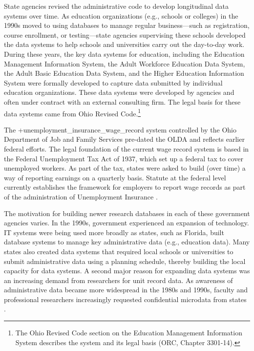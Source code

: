 \documentclass[
]{book}
\begin{document}
State agencies revised the administrative code to develop longitudinal data systems over time. As education organizations (e.g., schools or colleges) in the 1990s moved to using databases to manage regular business---such as registration, course enrollment, or testing---state agencies supervising these schools developed the data systems to help schools and universities carry out the day-to-day work. During these years, the key data systems for education, including the Education Management Information System, the Adult Workforce Education Data System, the Adult Basic Education Data System, and the Higher Education Information System were formally developed to capture data submitted by individual education organizations. These data systems were developed by agencies and often under contract with an external consulting firm. The legal basis for these data systems came from Ohio Revised Code.\footnote{The Ohio Revised Code section on the Education Management Information System describes the system and its legal basis (ORC, Chapter 3301-14).}

The +unemployment\_insurance\_wage\_record\textbar{} system controlled by the Ohio Department of Job and Family Services pre-dated the OLDA and reflects earlier federal efforts. The legal foundation of the current wage record system is based in the Federal Unemployment Tax Act of 1937, which set up a federal tax to cover unemployed workers. As part of the tax, states were asked to build (over time) a way of reporting earnings on a quarterly basis. Statute at the federal level currently establishes the framework for employers to report wage records as part of the administration of Unemployment Insurance \citep{workforceinformationcouncil2014}.

The motivation for building newer research databases in each of these government agencies varies. In the 1990s, government experienced an expansion of technology. IT systems were being used more broadly as states, such as Florida, built database systems to manage key administrative data (e.g., education data). Many states also created data systems that required local schools or universities to submit administrative data using a planning schedule, thereby building the local capacity for data systems. A second major reason for expanding data systems was an increasing demand from researchers for unit record data. As awareness of administrative data became more widespread in the 1980s and 1990s, faculty and professional researchers increasingly requested confidential microdata from states \citep{borus1982, pfeiffer1998, stevens1989, stevens2012}.
\end{document}
